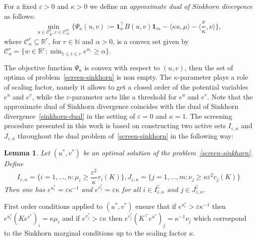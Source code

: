 \documentclass{article}
\newtheorem{lemma}{Lemma}
\newcommand{\inr}[1]{\langle #1 \rangle}
\newcommand{\R}{{\mathbb{R}}}
\begin{document}
For a fixed $\varepsilon > 0$ and $\kappa > 0$ we define an \emph{approximate dual of Sinkhorn divergence} as follows:
\begin{equation} 
\label{screen-sinkhorn}
\min_{u \in \mathcal{C}^n_{\frac \varepsilon \kappa}, v\in \mathcal{C}^m_{\varepsilon\kappa}} \big\{\Psi_{\kappa}(u,v):= \mathbf{1}_n^\top B(u,v)\mathbf{1}_m - \inr{\kappa u, \mu} - \inr{\frac v\kappa, \nu} \big\},
\end{equation}
where $\mathcal{C}^r_{\alpha} \subseteq \R^r$, for $r\in \mathbb N$ and $\alpha >0$, is a convex set  given by $\mathcal{C}^r_{\alpha} = \{w \in \R^{r}: \min_{1\leq i\leq r} e^{w_i} \geq \alpha\}$.

The objective function $\Psi_{\kappa}$ is convex with respect to $(u,v)$, then the set of optima of problem~\eqref{screen-sinkhorn} is non empty. 
The $\kappa$-parameter plays a role of scaling factor, namely it allows to get a closed order of the potential variables $e^u$ and $e^v$, while the $\varepsilon$-parameter acts like a threshold for $e^u$ and $e^v$.
Note that the approximate dual of Sinkhorn divergence coincides with the dual of Sinkhorn divergence~\eqref{sinkhorn-dual} in the setting of $\varepsilon=0$ and $\kappa=1$.
The screening procedure presented in this work is based on constructing two {active sets} $I_{\varepsilon, \kappa}$ and $J_{\varepsilon, \kappa}$ throughout the dual problem of~\eqref{screen-sinkhorn} in the following way:

\begin{lemma}
\label{lemma_actives_sets}
Let $(u^{*}, v^{*})$ be an optimal solution of the problem~\eqref{screen-sinkhorn}. 
Define
\begin{equation}
\label{I_epsilon_kappa_J_epsilon_kappa}
I_{\varepsilon,\kappa} = \big\{i=1, \ldots, n: \mu_i \geq \frac {\varepsilon^2} \kappa^{} r_i(K)\big\}, J_{\varepsilon,\kappa} = \big\{j=1, \ldots, m: \nu_j \geq \kappa{\varepsilon^2}{} c_j(K)\big\}
\end{equation}
Then one has $e^{u^{*}_i} = \varepsilon\kappa^{-1}$ and $e^{v^{*}_j} = \varepsilon\kappa$ for all $i \in I^\complement_{\varepsilon,\kappa} $ and $j\in J^\complement_{\varepsilon,\kappa} .$
\end{lemma}

First order conditions applied to $(u^{*}, v^{*})$ ensure that if $e^{u^{*}_i} > \varepsilon\kappa^{-1}$ then $e^{u^{*}_i} (Ke^{v^{*}})_i =  \kappa\mu_i$ and if $e^{v^{*}_j} > \varepsilon\kappa$ then $e^{v^{*}_j} (K^\top e^{u^{*}})_j =  \kappa^{-1}\nu_j$ 
which correspond to the Sinkhorn marginal conditions up to the scaling factor $\kappa$. 
\end{document}
